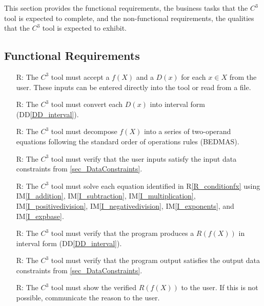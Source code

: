 \documentclass[12pt]{article}
\newcommand{\ddref}[1]{DD\ref{#1}}
\newcommand{\iref}[1]{IM\ref{#1}}
\newcounter{reqnum} %
\newcommand{\rref}[1]{R\ref{#1}}
\newcommand{\prognameAbbrv}{$C^{3}$}
\begin{document}
This section provides the functional requirements, the business tasks that the
\prognameAbbrv{} tool is expected to complete, and the non-functional 
requirements, the qualities that the \prognameAbbrv{} tool is expected to 
exhibit.

\subsection{Functional Requirements}

\noindent \begin{itemize}

\item[R\refstepcounter{reqnum}\thereqnum \label{R_Inputs}:] The 
\prognameAbbrv{} tool must accept a $f(X)$ and a $D(x)$ for each $x \in X$ from 
the user. These inputs can be entered directly into the tool or read from a 
file.

\item[R\refstepcounter{reqnum}\thereqnum \label{R_conditionX}:] The 
\prognameAbbrv{} tool must convert each $D(x)$ into interval form 
(\ddref{DD_interval}).

\item[R\refstepcounter{reqnum}\thereqnum \label{R_conditionfx}:] The 
\prognameAbbrv{} tool must decompose $f(X)$ into a series of two-operand 
equations following the standard order of operations rules (BEDMAS).

\item[R\refstepcounter{reqnum}\thereqnum \label{R_verifyinputs}:] The 
\prognameAbbrv{} tool must verify that the user inputs satisfy the input data 
constraints from \ref{sec_DataConstraints}.

\item[R\refstepcounter{reqnum}\thereqnum \label{R_Calculate}:] The 
\prognameAbbrv{} tool must solve each equation identified in 
\rref{R_conditionfx} using \iref{I_addition}, \iref{I_subtraction}, 
\iref{I_multiplication}, \iref{I_positivedivision}, \iref{I_negativedivision}, 
\iref{I_exponents}, and \iref{I_expbase}.

\item[R\refstepcounter{reqnum}\thereqnum \label{R_VerifyOutput}:] The 
\prognameAbbrv{} tool must verify that the program produces a $R(f(X))$ in 
interval form (\ddref{DD_interval}).

\item[R\refstepcounter{reqnum}\thereqnum \label{R_VerifyOutputConstraints}:] 
The \prognameAbbrv{} tool must verify that the program output satisfies the 
output data constraints from \ref{sec_DataConstraints}.

\item[R\refstepcounter{reqnum}\thereqnum \label{R_Output}:] The 
\prognameAbbrv{} tool must show the verified $R(f(X))$ to the user. If this is 
not possible, communicate the reason to the user.

\end{itemize}
\end{document}
